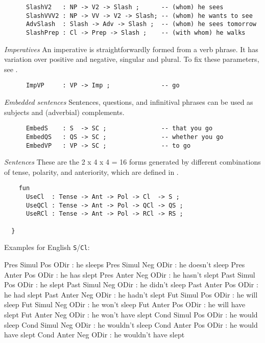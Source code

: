 \documentclass[11pt,a4paper]{article}
\newcommand{\commOut}[1]{}
\newcommand{\subsubsubsection}[1]{\textit{#1}}
\begin{document}
\begin{verbatim}
      SlashV2   : NP -> V2 -> Slash ;      -- (whom) he sees
      SlashVVV2 : NP -> VV -> V2 -> Slash; -- (whom) he wants to see 
      AdvSlash  : Slash -> Adv -> Slash ;  -- (whom) he sees tomorrow
      SlashPrep : Cl -> Prep -> Slash ;    -- (with whom) he walks 
\end{verbatim}

\subsubsubsection{Imperatives}
An imperative is straightforwardly formed from a verb phrase.
It has variation over positive and negative, singular and plural.
To fix these parameters, see .

\begin{verbatim}
      ImpVP     : VP -> Imp ;              -- go
\end{verbatim}

\subsubsubsection{Embedded sentences}
Sentences, questions, and infinitival phrases can be used as
subjects and (adverbial) complements.

\begin{verbatim}
      EmbedS    : S  -> SC ;               -- that you go
      EmbedQS   : QS -> SC ;               -- whether you go
      EmbedVP   : VP -> SC ;               -- to go
\end{verbatim}

\subsubsubsection{Sentences}
These are the 2 x 4 x 4 = 16 forms generated by different
combinations of tense, polarity, and
anteriority, which are defined in .

\begin{verbatim}
    fun
      UseCl  : Tense -> Ant -> Pol -> Cl  -> S ;
      UseQCl : Tense -> Ant -> Pol -> QCl -> QS ;
      UseRCl : Tense -> Ant -> Pol -> RCl -> RS ;
  
  }
\end{verbatim}

Examples for English \texttt{S}/\texttt{Cl}:

Pres  Simul  Pos  ODir  : he sleeps
Pres  Simul  Neg  ODir  : he doesn't sleep
Pres  Anter  Pos  ODir  : he has slept
Pres  Anter  Neg  ODir  : he hasn't slept
Past  Simul  Pos  ODir  : he slept
Past  Simul  Neg  ODir  : he didn't sleep
Past  Anter  Pos  ODir  : he had slept
Past  Anter  Neg  ODir  : he hadn't slept
Fut   Simul  Pos  ODir  : he will sleep
Fut   Simul  Neg  ODir  : he won't sleep
Fut   Anter  Pos  ODir  : he will have slept
Fut   Anter  Neg  ODir  : he won't have slept
Cond  Simul  Pos  ODir  : he would sleep
Cond  Simul  Neg  ODir  : he wouldn't sleep
Cond  Anter  Pos  ODir  : he would have slept
Cond  Anter  Neg  ODir  : he wouldn't have slept
\commOut{Produced by 
gfdoc - a rudimentary GF document generator.
(c) Aarne Ranta (\htmladdnormallink{aarne@cs.chalmers.se}{mailto:aarne@cs.chalmers.se}) 2002 under GNU GPL.}
\end{document}
